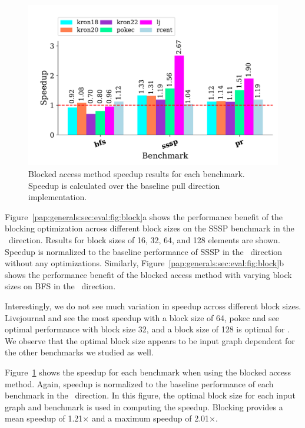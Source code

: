 \begin{figure}[h]
    \centering
    \includegraphics[scale = 0.6]{graphit-figures/all-blocked.pdf}
    \caption{Blocked access method speedup results for each benchmark. Speedup is calculated over the baseline pull direction implementation.} %
    \label{pap:generals:sec:eval:fig:blocked}
\end{figure}
 
Figure~\ref{pap:generals:sec:eval:fig:block}a shows the performance benefit of the blocking optimization across different block sizes on the SSSP benchmark in the \pull~direction. Results for block sizes of 16, 32, 64, and 128 elements are shown.
Speedup is normalized to the baseline performance of SSSP in the \pull~direction without any optimizations.
Similarly, Figure~\ref{pap:generals:sec:eval:fig:block}b shows the performance benefit of the blocked access method with varying block sizes on BFS in the \pull~direction.
 
Interestingly, we do not see much variation in speedup across different block sizes. 
Livejournal and  see the most speedup with a block size of 64, pokec and  see optimal performance with block size 32, and a block size of 128 is optimal for . 
We observe that the optimal block size appears to be input graph dependent for the other benchmarks we studied as well. 
 
Figure~\ref{pap:generals:sec:eval:fig:blocked} shows the speedup for each benchmark when using the blocked access method. 
Again, speedup is normalized to the baseline performance of each benchmark in the \pull~direction.
In this figure, the optimal block size for each input graph and benchmark is used in computing the speedup. 
Blocking provides a mean speedup of 1.21$\times$ and a maximum speedup of 2.01$\times$. 
 
